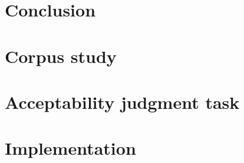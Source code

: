 \documentclass[12pt]{report}
\begin{document}
	\chapter{Conclusion} \label{ch:conclusion}
	


	
	
	

	\appendix
	\clearpage
	\chapter{Corpus study} \label{appx:corpus_study}
	
	\chapter{Acceptability judgment task} \label{appx:acc_experiment}
	
	\chapter{Implementation}\label{appx:implementation}
	
\end{document}
